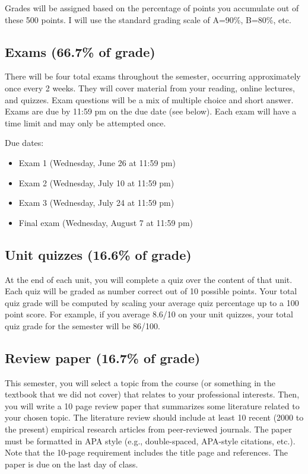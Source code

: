 \documentclass[10pt]{article}
\begin{document}
Grades will be assigned based on the percentage of points you accumulate out of these 500 points.  I will use the standard grading scale of A=90\%, B=80\%, etc.

\subsection*{Exams (66.7\% of grade)}
\label{sec:org5730145}
There will be four total exams throughout the semester, occurring 
approximately once every 2  weeks.  They will cover material 
from your reading, online lectures, and quizzes.  Exam questions will be a mix of multiple choice and short answer.  Exams are due by 11:59 pm on 
the due date (see below).  Each exam will have a time limit and may only 
be attempted once.

Due dates:

\begin{itemize}
\item Exam 1 (Wednesday, June 26 at 11:59 pm)
\item Exam 2 (Wednesday, July 10 at 11:59 pm)
\item Exam 3 (Wednesday, July 24 at 11:59 pm)
\item Final exam (Wednesday, August 7 at 11:59 pm)
\end{itemize}

\subsection*{Unit quizzes (16.6\% of grade)}
\label{sec:orgf42b94e}
At the end of each unit, you will complete a quiz over the content of that 
unit. Each quiz will be graded as number correct out of 10 possible points.  Your total quiz grade will be computed by scaling your average quiz percentage up to a 100 point score.  For example, if you average 8.6/10 on your unit quizzes, your total quiz grade for the semester will be 86/100. 

\subsection*{Review paper (16.7\% of grade)}
\label{sec:org4e0e897}
This semester, you will select a topic from the course (or something in the textbook that we did not cover) that relates to your professional interests.  Then, you will write a 10 page review paper that summarizes some literature related to your chosen topic. The literature review should include at least 10 recent (2000 to the present) empirical research articles from peer-reviewed journals. The paper must be formatted in APA style (e.g., double-spaced, APA-style citations, etc.).  Note that the 10-page requirement includes the title page and references.  The paper is due on the last day of class.   
\end{document}
